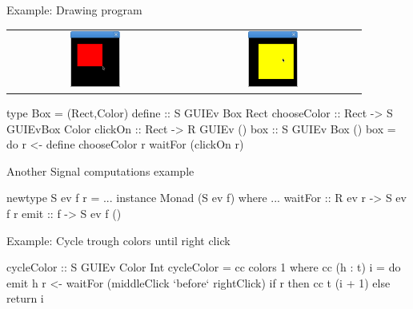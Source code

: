 \documentclass{beamer}
\begin{document}
\begin{frame}{Example: Drawing program}
\centering
\begin{tabular}{c c}
\includegraphics[width=0.3\textwidth]{01.png}
&
\includegraphics[width=0.3\textwidth]{02.png}
\end{tabular}
\begin{code}
type Box = (Rect,Color)
define        :: S GUIEv Box Rect
chooseColor   :: Rect -> S GUIEvBox Color
clickOn       :: Rect -> R GUIEv ()
box ::  S GUIEv Box ()
box = do  r <- define
          chooseColor r
          waitFor (clickOn r)
\end{code}
\end{frame}


\begin{frame}{Another Signal computations example}
\begin{code} 
newtype S ev f r = ...
instance Monad (S ev f) where ...
waitFor   :: R ev r -> S ev f r
emit      :: f -> S ev f ()
\end{code}

Example: Cycle trough colors until right click 
\begin{code}
cycleColor :: S GUIEv Color Int
cycleColor = cc colors 1 where
   cc (h : t) i = 
     do  emit h
         r <- waitFor (middleClick `before` rightClick)
         if r then cc t (i + 1) else return i
\end{code}

\end{frame}
\end{document}
